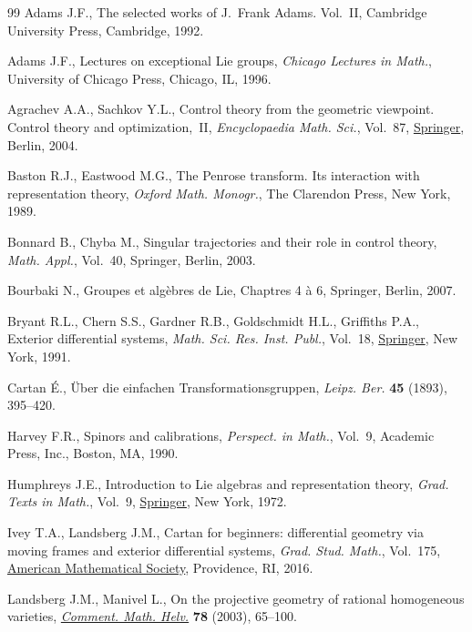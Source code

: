 \documentclass[11pt]{article}
\numberwithin{equation}{section}
\numberwithin{equation}{section}
\theoremstyle{definition}
\newcommand{\0}{\boldsymbol{0}}
\begin{document}
\begin{thebibliography}{99}
Adams J.F., The selected works of {J}.~{F}rank {A}dams. {V}ol.~{II}, Cambridge
 University Press, Cambridge, 1992.

Adams J.F., Lectures on exceptional {L}ie groups, \textit{Chicago Lectures in Math.},
 University of Chicago Press, Chicago, IL, 1996.

Agrachev A.A., Sachkov Y.L., Control theory from the geometric viewpoint.
 {C}ontrol theory and optimization,~{II}, \textit{Encyclopaedia Math. Sci.},
 Vol.~87, \href{https://doi.org/10.1007/978-3-662-06404-7}{Springer}, Berlin,
 2004.

Baston R.J., Eastwood M.G., The {P}enrose transform. Its interaction with
 representation theory, \textit{Oxford Math. Monogr.}, The Clarendon Press, New York,
 1989.

Bonnard B., Chyba M., Singular trajectories and their role in control theory,
 \textit{Math. Appl.}, Vol.~40, Springer, Berlin, 2003.

Bourbaki N., Groupes et alg\`ebres de Lie, Chaptres 4 \`a 6, Springer, Berlin,
 2007.

Bryant R.L., Chern S.S., Gardner R.B., Goldschmidt H.L., Griffiths P.A.,
 Exterior differential systems, \textit{Math. Sci. Res. Inst. Publ.}, Vol.~18,
 \href{https://doi.org/10.1007/978-1-4613-9714-4}{Springer}, New York, 1991.

Cartan \'E., \"Uber die einfachen Transformationsgruppen, \textit{Leipz.
 Ber.} \textbf{45} (1893), 395--420.

Harvey F.R., Spinors and calibrations, \textit{Perspect. in Math.}, Vol.~9,
 Academic Press, Inc., Boston, MA, 1990.

Humphreys J.E., Introduction to {L}ie algebras and representation theory,
 \textit{Grad. Texts in Math.}, Vol.~9,
 \href{https://doi.org/10.1007/978-1-4612-6398-2}{Springer}, New York, 1972.

Ivey T.A., Landsberg J.M., Cartan for beginners: differential geometry via
 moving frames and exterior differential systems, \textit{Grad. Stud. Math.},
 Vol.~175, \href{https://doi.org/10.1090/gsm/175}{American Mathematical
 Society}, Providence, RI, 2016.

Landsberg J.M., Manivel L., On the projective geometry of rational homogeneous
 varieties, \href{https://doi.org/10.1007/s000140300003}{\textit{Comment.
 Math. Helv.}} \textbf{78} (2003), 65--100.


\end{thebibliography}
\end{document}
